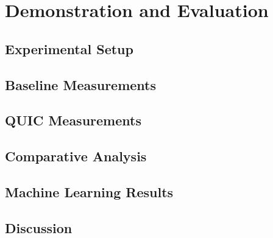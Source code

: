 \section{Demonstration and Evaluation}
\subsection{Experimental Setup}
\subsection{Baseline Measurements}
\subsection{QUIC Measurements}
\subsection{Comparative Analysis}
\subsection{Machine Learning Results}
\subsection{Discussion}

\clearpage